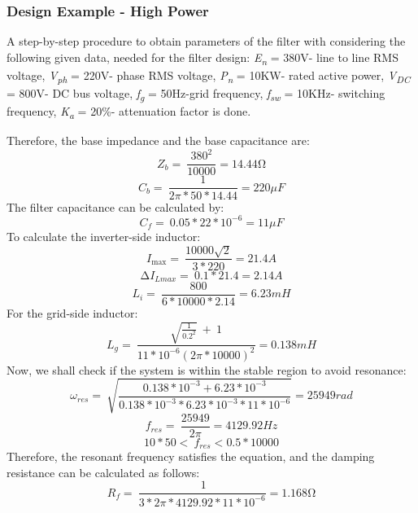 \documentclass[12pt,a4paper]{book}
\begin{document}
\subsubsection{Design Example - High Power}
A step-by-step procedure to obtain parameters of the filter with considering the following given data, needed for the filter design: \emph{E\textsubscript{n}} = 380V- line to line RMS voltage, \emph{V\textsubscript{ph}} = 220V- phase RMS voltage, \emph{P\textsubscript{n}} = 10KW- rated active power, \emph{V\textsubscript{DC}} = 800V- DC bus voltage, \emph{f\textsubscript{g}} = 50Hz-grid frequency, \emph{f\textsubscript{sw}} = 10KHz- switching frequency, \emph{K\textsubscript{a }}= 20\%- attenuation factor is done.

Therefore, the base impedance and the base capacitance are:
\[Z_{b} = \ \frac{380^{2}}{10000} = 14.44\mathrm{\Omega}\]
\[C_{b} = \ \frac{1}{2\pi*50*14.44} = 220\mu F\]
The filter capacitance can be calculated by:
\[C_{f} = \ 0.05*22*10^{- 6} = 11\mu F\]
To calculate the inverter-side inductor:
\[I_{\max} = \ \frac{10000\sqrt{2}}{3*220} = 21.4A\]
\[{\mathrm{\Delta}I}_{Lmax} = \ 0.1*21.4 = 2.14A\]
\[L_{i} = \ \frac{800}{6*10000*2.14} = 6.23mH\]
For the grid-side inductor:
\[L_{g} = \ \frac{\sqrt{\frac{1}{{0.2}^{2}}}\  + \ 1}{11*10^{- 6}{(2\pi*10000)}^{2}} = 0.138mH\]
Now, we shall check if the system is within the stable region to avoid resonance:
\[\omega_{res} = \ \sqrt{\frac{0.138*10^{- 3} + 6.23*10^{- 3}}{0.138*10^{- 3}*6.23*10^{- 3}*11*10^{- 6}}} = 25949rad\]
\[f_{res} = \ \frac{25949}{2\pi} = 4129.92Hz\]
\[10*50 < \ f_{res} < 0.5*10000\]
Therefore, the resonant frequency satisfies the equation, and the damping resistance can be calculated as follows:
\[R_{f} = \ \frac{\ 1}{3*2\pi*4129.92*11*10^{- 6}} = 1.168\mathrm{\Omega}\]

\end{document}
